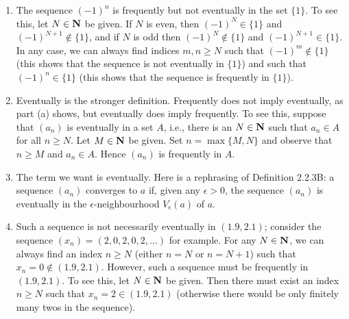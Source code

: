 \documentclass{lew98_solutions}
\begin{document}
\begin{solution}
    \begin{enumerate}
        \item The sequence \( (-1)^n \) is frequently but not eventually in the set \( \{ 1 \} \). To see this, let \( N \in \mathbf{N} \) be given. If \( N \) is even, then \( (-1)^N \in \{ 1 \} \) and \( (-1)^{N+1} \not\in \{ 1 \} \), and if \( N \) is odd then \( (-1)^N \not\in \{ 1 \} \) and \( (-1)^{N+1} \in \{ 1 \} \). In any case, we can always find indices \( m, n \geq N \) such that \( (-1)^m \not\in \{ 1 \} \) (this shows that the sequence is not eventually in \( \{ 1 \} \)) and such that \( (-1)^n \in \{ 1 \} \) (this shows that the sequence is frequently in \( \{ 1 \} \)).

        \item Eventually is the stronger definition. Frequently does not imply eventually, as part (a) shows, but eventually does imply frequently. To see this, suppose that \( (a_n) \) is eventually in a set \( A \), i.e., there is an \( N \in \mathbf{N} \) such that \( a_n \in A \) for all \( n \geq N \). Let \( M \in \mathbf{N} \) be given. Set \( n = \max \{ M, N \} \) and observe that \( n \geq M \) and \( a_n \in A \). Hence \( (a_n) \) is frequently in \( A \).

        \item The term we want is eventually. Here is a rephrasing of Definition 2.2.3B: a sequence \( (a_n) \) converges to \( a \) if, given any \( \epsilon > 0 \), the sequence \( (a_n) \) is eventually in the \( \epsilon \)-neighbourhood \( V_{\epsilon}(a) \) of \( a \).

        \item Such a sequence is not necessarily eventually in \( (1.9, 2.1) \); consider the sequence \( (x_n) = (2, 0, 2, 0, 2, \ldots) \) for example. For any \( N \in \mathbf{N} \), we can always find an index \( n \geq N \) (either \( n = N \) or \( n = N + 1 \)) such that \( x_n = 0 \not\in (1.9, 2.1) \). However, such a sequence must be frequently in \( (1.9, 2.1) \). To see this, let \( N \in \mathbf{N} \) be given. Then there must exist an index \( n \geq N \) such that \( x_n = 2 \in (1.9, 2.1) \) (otherwise there would be only finitely many twos in the sequence).
    \end{enumerate}
\end{solution}
\end{document}
